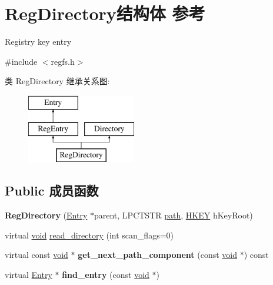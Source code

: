 \hypertarget{struct_reg_directory}{}\section{Reg\+Directory结构体 参考}
\label{struct_reg_directory}


Registry key entry  




{\ttfamily \#include $<$regfs.\+h$>$}

类 Reg\+Directory 继承关系图\+:\begin{figure}[H]
\begin{center}
\leavevmode
\includegraphics[height=3.000000cm]{struct_reg_directory}
\end{center}
\end{figure}
\subsection*{Public 成员函数}
\begin{DoxyCompactItemize}
\item 
\mbox{\label{struct_reg_directory_a877d80bf3f694f00c9129bde53f87939}} 
{\bfseries Reg\+Directory} (\hyperlink{struct_entry}{Entry} $\ast$parent, L\+P\+C\+T\+S\+TR \hyperlink{structpath}{path}, \hyperlink{interfacevoid}{H\+K\+EY} h\+Key\+Root)
\item 
virtual \hyperlink{interfacevoid}{void} \hyperlink{struct_reg_directory_a48c2c8255423b0bcaca17bbb2fda20b0}{read\+\_\+directory} (int scan\+\_\+flags=0)
\item 
\mbox{\label{struct_reg_directory_a4de1ce077d1db4d267de1f3760ddb49c}} 
virtual const \hyperlink{interfacevoid}{void} $\ast$ {\bfseries get\+\_\+next\+\_\+path\+\_\+component} (const \hyperlink{interfacevoid}{void} $\ast$) const
\item 
\mbox{\label{struct_reg_directory_a23b8c0edb3e9fb70f04ad387765fc618}} 
virtual \hyperlink{struct_entry}{Entry} $\ast$ {\bfseries find\+\_\+entry} (const \hyperlink{interfacevoid}{void} $\ast$)
\end{DoxyCompactItemize}
